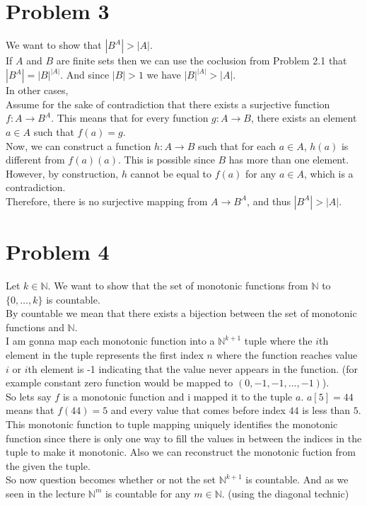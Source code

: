 \documentclass{article}
\begin{document}
\section*{Problem 3}
We want to show that \(|B^A| > |A|\).\\
If \(A\) and \(B\) are finite sets then we can use the coclusion from Problem 2.1 that \(|B^A| = |B|^{|A|}\). And since \(|B| > 1\) we have \(|B|^{|A|} > |A|\).\\
In other cases, \\
Assume for the sake of contradiction that there exists a surjective function \( f: A \to B^A \). This means that for every function \( g: A \to B \), there exists an element \( a \in A \) such that \( f(a) = g \).\\
Now, we can construct a function \( h: A \to B \) such that for each \( a \in A \), \( h(a) \) is different from \( f(a)(a) \). This is possible since \( B \) has more than one element.\\
However, by construction, \( h \) cannot be equal to \( f(a) \) for any \( a \in A \), which is a contradiction.\\
Therefore, there is no surjective mapping from \( A \to B^A \), and thus \(|B^A| > |A|\).

\section*{Problem 4}
Let \( k \in \mathbb{N} \). We want to show that the set of monotonic functions from \( \mathbb{N} \) to \( \{0, \ldots, k\} \) is countable.\\
By countable we mean that there exists a bijection between the set of monotonic functions and \( \mathbb{N} \).\\
I am gonna map each monotonic function into a \(\mathbb{N}^{k+1}\) tuple where the \(i\)th element in the tuple represents the first index \(n\) where the function reaches value \(i\)
or \(i\)th element is -1 indicating that the value never appears in the function. (for example constant zero function would be mapped to \((0, -1, -1, ..., -1)\)).\\
So lets say \(f\) is a monotonic function and i mapped it to the tuple \(a\). \(a[5] = 44\) means that \(f(44) = 5\) and every value that comes before index \(44\) is less than \(5\).
This monotonic function to tuple mapping uniquely identifies the monotonic function since there is only one way to fill the values in between the indices in the tuple to make it monotonic.
Also we can reconstruct the monotonic fuction from the given the tuple. \\
So now question becomes whether or not the set \(\mathbb{N}^{k+1}\) is countable. And as we seen in the lecture \(\mathbb{N}^m\) is countable for any \(m \in \mathbb{N}\). (using the diagonal technic)\\
\end{document}
